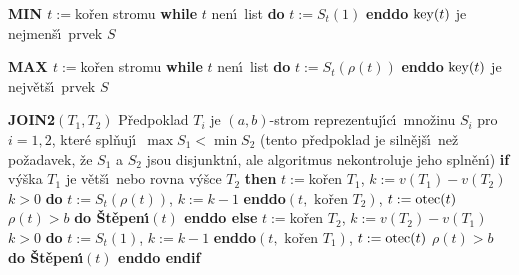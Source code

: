 {\bf MIN\newline 
$t:=$}ko\v ren stromu\newline 
{\bf while} $t$ nen\'\i\ list {\bf do} $t:=S_t(1)$ {\bf enddo}\newline 
$\operatorname{key}(t)$ je nejmen\v s\'\i\ prvek $S$
\medskip

{\bf MAX\newline 
$t:=$}ko\v ren stromu\newline 
{\bf while} $t$ nen\'\i\ list {\bf do} $t:=S_t(\rho (t))$ {\bf enddo}\newline 
$\operatorname{key}(t)$ je nejv\v et\v s\'\i\ prvek $S$
\medskip

{\bf JOIN2$(T_1,T_2)$}\newline
P\v redpoklad $T_i$ je $(a,b)$-strom reprezentuj\'\i c\'\i\ 
mno\v zinu $S_i$ pro $i=1,2$, kter\'e spl\v nuj\'\i\ $\max S_1<\min 
S_2$ 
(tento p\v redpoklad je siln\v ej\v s\'\i\ ne\v z po\v zadavek, \v ze $
S_1$ a 
$S_2$ jsou disjunktn\'\i , ale algoritmus nekontroluje jeho spln\v en\'\i )\newline 
{\bf if} v\'y\v ska $T_1$ je v\v et\v s\'\i\ nebo rovna v\'y\v sce $T_2$ {\bf then}\newline 
\phantom{---}$t:=$ko\v ren $T_1$, $k:=v(T_1)-v(T_2)$\newline 
\phantom{---}{\bf while} $k>0$ {\bf do} $t:=S_t(\rho (t))$, $k:=k-1$ {\bf enddo}\newline \phantom{---}{\bf Spojen\'\i}$(t,\text{ ko\v ren }T_2)$, $t:=\operatorname{otec}(t)$\newline 
\phantom{---}{\bf while} $\rho (t)>b$ {\bf do \v St\v epen\'\i$(t)$ enddo\newline 
else}\newline 
\phantom{---}$t:=$ko\v ren $T_2$, $k:=v(T_2)-v(T_1)$ \newline 
\phantom{---}{\bf while} $k>0$ {\bf do} $t:=S_t(1)$, $k:=k-1$ {\bf enddo}\newline \phantom{---}{\bf Spojen\'\i}$(t,\text{ ko\v ren }T_1)$, $t:=\operatorname{otec}(t)$\newline 
\phantom{---}{\bf while} $\rho (t)>b$ {\bf do \v St\v epen\'\i$(t)$ enddo\newline 
endif}
\medskip

